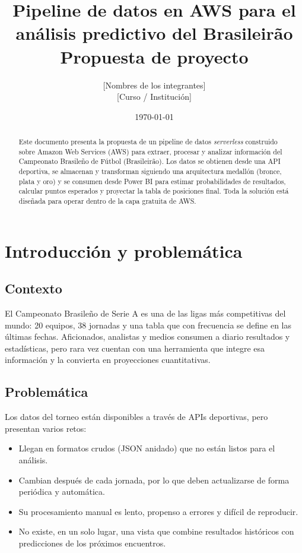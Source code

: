 \documentclass[11pt,a4paper]{article}
\title{
  \vspace{-1cm}
  {\color{awsnavy}\LARGE\bfseries Pipeline de datos en AWS para el análisis predictivo del Brasileirão}\\[0.6cm]
  \large Propuesta de proyecto
}
\author{[Nombres de los integrantes]\\[0.2cm] \small [Curso / Institución]}
\date{\today}
\begin{document}
\maketitle
\thispagestyle{empty}

\begin{abstract}
\noindent Este documento presenta la propuesta de un pipeline de datos \textit{serverless} construido sobre Amazon Web Services (AWS) para extraer, procesar y analizar información del Campeonato Brasileño de Fútbol (Brasileirão). Los datos se obtienen desde una API deportiva, se almacenan y transforman siguiendo una arquitectura medallón (bronce, plata y oro) y se consumen desde Power BI para estimar probabilidades de resultados, calcular puntos esperados y proyectar la tabla de posiciones final. Toda la solución está diseñada para operar dentro de la capa gratuita de AWS.
\end{abstract}

\newpage
\tableofcontents
\newpage

\section{Introducción y problemática}

\subsection{Contexto}
El Campeonato Brasileño de Serie A es una de las ligas más competitivas del mundo: 20 equipos, 38 jornadas y una tabla que con frecuencia se define en las últimas fechas. Aficionados, analistas y medios consumen a diario resultados y estadísticas, pero rara vez cuentan con una herramienta que integre esa información y la convierta en proyecciones cuantitativas.

\subsection{Problemática}
Los datos del torneo están disponibles a través de APIs deportivas, pero presentan varios retos:
\begin{itemize}
  \item Llegan en formatos crudos (JSON anidado) que no están listos para el análisis.
  \item Cambian después de cada jornada, por lo que deben actualizarse de forma periódica y automática.
  \item Su procesamiento manual es lento, propenso a errores y difícil de reproducir.
  \item No existe, en un solo lugar, una vista que combine resultados históricos con predicciones de los próximos encuentros.
\end{itemize}
\end{document}
